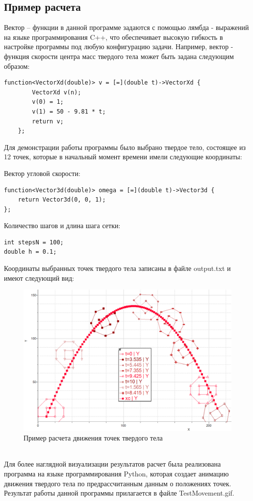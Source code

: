 \documentclass[12pt,a4paper]{article}
\begin{document}
\subsection{Пример расчета}
Вектор – функции в данной программе задаются с помощью лямбда - выражений на языке программирования C++, что обеспечивает высокую гибкость в настройке программы под любую конфигурацию задачи. Например, вектор - функция скорости центра масс твердого тела может быть задана следующим образом:
\begin{lstlisting}
function<VectorXd(double)> v = [=](double t)->VectorXd {
        VectorXd v(n);
        v(0) = 1;
        v(1) = 50 - 9.81 * t;
        return v;
    };
\end{lstlisting}
Для демонстрации работы программы было выбрано твердое тело, состоящее из 12 точек, которые в начальный момент времени имели следующие координаты:

Вектор угловой скорости:
\begin{lstlisting}
function<Vector3d(double)> omega = [=](double t)->Vector3d {
    return Vector3d(0, 0, 1);
};
\end{lstlisting}
Количество шагов и длина шага сетки:
\begin{lstlisting}
int stepsN = 100;
double h = 0.1;
\end{lstlisting}
Координаты выбранных точек твердого тела записаны в файле output.txt и имеют следующий вид:
\begin{figure}[h!]
  \includegraphics[width=\linewidth]{Pictures/xki_parabolic_12points.png}
  \caption{Пример расчета движения точек твердого тела}
  \label{fig:xki}
\end{figure}
\\Для более наглядной визуализации результатов расчет была реализована программа на языке программирования Python, которая создает анимацию движения твердого тела по предрассчитанным данным о положениях точек.
Результат работы данной программы прилагается в файле TestMovement.gif.
\end{document}
